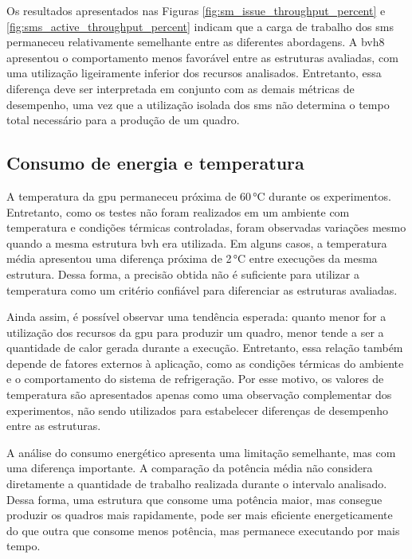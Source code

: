 Os resultados apresentados nas Figuras \ref{fig:sm_issue_throughput_percent} e \ref{fig:sms_active_throughput_percent} indicam que a carga de trabalho dos \glspl{sm} permaneceu relativamente semelhante entre as diferentes abordagens. A \gls{bvh8} apresentou o comportamento menos favorável entre as estruturas avaliadas, com uma utilização ligeiramente inferior dos recursos analisados. Entretanto, essa diferença deve ser interpretada em conjunto com as demais métricas de desempenho, uma vez que a utilização isolada dos \glspl{sm} não determina o tempo total necessário para a produção de um quadro.

\FloatBarrier

\subsection{Consumo de energia e temperatura}

A temperatura da \gls{gpu} permaneceu próxima de 60\,°C durante os experimentos. Entretanto, como os testes não foram realizados em um ambiente com temperatura e condições térmicas controladas, foram observadas variações mesmo quando a mesma estrutura \gls{bvh} era utilizada. Em alguns casos, a temperatura média apresentou uma diferença próxima de 2\,°C entre execuções da mesma estrutura. Dessa forma, a precisão obtida não é suficiente para utilizar a temperatura como um critério confiável para diferenciar as estruturas avaliadas.

Ainda assim, é possível observar uma tendência esperada: quanto menor for a utilização dos recursos da \gls{gpu} para produzir um quadro, menor tende a ser a quantidade de calor gerada durante a execução. Entretanto, essa relação também depende de fatores externos à aplicação, como as condições térmicas do ambiente e o comportamento do sistema de refrigeração. Por esse motivo, os valores de temperatura são apresentados apenas como uma observação complementar dos experimentos, não sendo utilizados para estabelecer diferenças de desempenho entre as estruturas.

A análise do consumo energético apresenta uma limitação semelhante, mas com uma diferença importante. A comparação da potência média não considera diretamente a quantidade de trabalho realizada durante o intervalo analisado. Dessa forma, uma estrutura que consome uma potência maior, mas consegue produzir os quadros mais rapidamente, pode ser mais eficiente energeticamente do que outra que consome menos potência, mas permanece executando por mais tempo.

